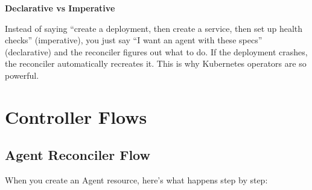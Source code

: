 \documentclass[12pt,a4paper,openany]{report}
\begin{document}
\begin{keyconceptbox}
\textbf{Declarative vs Imperative}

Instead of saying ``create a deployment, then create a service, then set up health checks'' (imperative), you just say ``I want an agent with these specs'' (declarative) and the reconciler figures out what to do. If the deployment crashes, the reconciler automatically recreates it. This is why Kubernetes operators are so powerful.
\end{keyconceptbox}


\chapter{Controller Flows}

\section{Agent Reconciler Flow}

When you create an Agent resource, here's what happens step by step:
\end{document}
